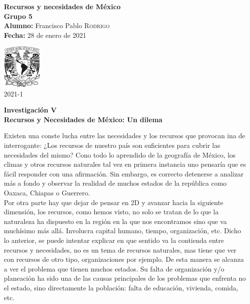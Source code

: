 \documentclass[12pt]{article}
\newcommand{\materia}{Recursos y necesidades de México}
\newcommand{\profesor}{Ing. Eduardo Alejandro Hernández González}
\newcommand{\grupo}{5}
\newcommand{\semestre}{2021-1}
\newcommand{\alumno}{Francisco Pablo \textsc{Rodrigo}}
\newcommand{\actividad}{Investigación V}
\newcommand{\titulo}{Recursos y Necesidades de México: Un dilema}
\newcommand{\fechaEntrega}{28 de enero de 2021}
\begin{document}
\begin{minipage}[t]{0.7\linewidth}
    \vspace{-1cm}
    \large{\textbf{\materia}}\\
    \large{\textbf{Grupo \grupo}}\\
    \large{\textbf{Alumno:} \alumno} \\
    \textbf{Fecha:} \fechaEntrega%
\end{minipage}\hfill
\begin{minipage}[t]{0.2\linewidth}
    \vspace{-1.2cm}
    \begin{flushright}
        \includegraphics[width=2cm]{unam-negro}\\
        \large{\semestre}    
    \end{flushright}
\end{minipage}
\begin{center}
\large{
    \textbf{\actividad}\\
    \textbf{\titulo} \\ 
}
\end{center}

Existen una conste lucha entre las necesidades y los recursos que provocan ina
de interrogante: ¿Los recursos de nuestro país son suficientes para cubrir las
necesidades del mismo? Cono todo lo aprendido de la geografía de México, los
climas y otros recursos naturales tal vez en primera instancia uno pensaría que
es fácil responder con una afirmación. Sin embargo, es correcto detenerse a
analizar más a fondo y observar la realidad de muchos estados de la república
como Oaxaca, Chiapas o Guerrero.\\

Por otra parte hay que dejar de pensar en 2D y avanzar hacia la siguiente
dimensión, los recursos, como hemos visto, no solo se tratan de lo que la
naturaleza ha dispuesto en la región en la que nos encontramos sino que va
muchísimo más allá. Involucra capital humano, tiempo, organización, etc.
Dicho lo anterior, se puede intentar explicar en que sentido va la contienda
entre recursos y necesidades, no es un tema de recursos naturales, mas tiene que
ver con recursos de otro tipo, organizaciones por ejemplo. De esta manera se
alcanza a ver el problema que tienen muchos estados. Su falta de organización
y/o planeación ha sido una de las causas principales de los problemas que
enfrenta no el estado, sino directamente la población: falta de educación,
vivienda, comida, etc.\\
\end{document}
